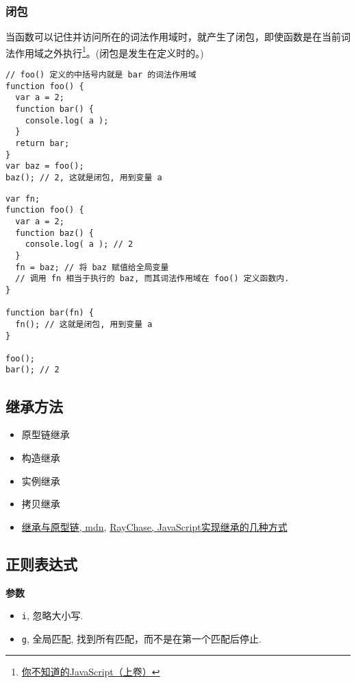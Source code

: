 \subsubsection{闭包}\label{ux95edux5305}

当函数可以记住并访问所在的词法作用域时，就产生了闭包，即使函数是在当前词法作用域之外执行\footnote{\href{http://book.douban.com/subject/26351021/}{你不知道的JavaScript（上卷）}}。(闭包是发生在定义时的。)

\begin{lstlisting}
// foo() 定义的中括号内就是 bar 的词法作用域
function foo() {
  var a = 2;
  function bar() {
    console.log( a );
  }
  return bar;
}
var baz = foo();
baz(); // 2, 这就是闭包, 用到变量 a
\end{lstlisting}

\begin{lstlisting}
var fn;
function foo() {
  var a = 2;
  function baz() {
    console.log( a ); // 2
  }
  fn = baz; // 将 baz 赋值给全局变量
  // 调用 fn 相当于执行的 baz, 而其词法作用域在 foo() 定义函数内.
}

function bar(fn) {
  fn(); // 这就是闭包, 用到变量 a
}

foo();
bar(); // 2
\end{lstlisting}

\subsection{继承方法}\label{ux7ee7ux627fux65b9ux6cd5}

\begin{itemize}
\item
  原型链继承
\item
  构造继承
\item
  实例继承
\item
  拷贝继承
\item
  \href{https://developer.mozilla.org/zh-CN/docs/Web/JavaScript/Inheritance_and_the_prototype_chain}{继承与原型链,
  mdn}, \href{http://raychase.iteye.com/blog/1337415}{RayChase,
  JavaScript实现继承的几种方式}
\end{itemize}

\subsection{正则表达式}\label{ux6b63ux5219ux8868ux8fbeux5f0f}

\textbf{参数}

\begin{itemize}
\tightlist
\item
  \lstinline!i!, 忽略大小写.
\item
  \lstinline!g!, 全局匹配, 找到所有匹配，而不是在第一个匹配后停止.
\end{itemize}

